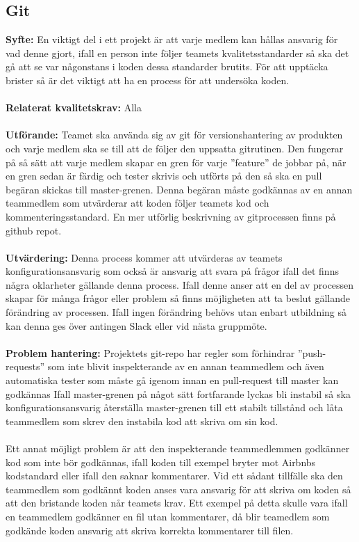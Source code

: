 \documentclass[10pt]{article}
\begin{document}
	\subsection{Git}
	\textbf{Syfte:} En viktigt del i ett projekt är att varje medlem kan hållas ansvarig för vad denne gjort, ifall en person inte följer teamets kvalitetsstandarder så ska det gå att se var någonstans i koden dessa standarder brutits. För att upptäcka brister så är det viktigt att ha en process för att undersöka koden.
	\\\\
	\textbf{Relaterat kvalitetskrav:} Alla
	\\\\
	\textbf{Utförande:} Teamet ska använda sig av git för versionshantering av produkten och varje medlem ska se till att de följer den uppsatta gitrutinen. Den fungerar på så sätt att varje medlem skapar en gren för varje ''feature'' de jobbar på, när en gren sedan är färdig och tester skrivis och utförts på den så ska en pull begäran skickas till master-grenen. Denna begäran måste godkännas av en annan teammedlem som utvärderar att koden följer teamets kod och kommenteringsstandard. En mer utförlig beskrivning av gitprocessen finns på github repot\cite{bib-gitguide}.
	\\\\
	\textbf{Utvärdering:} Denna process kommer att utvärderas av teamets konfigurationsansvarig som också är ansvarig att svara på frågor ifall det finns några oklarheter gällande denna process. Ifall denne anser att en del av processen skapar för många frågor eller problem så finns möjligheten att ta beslut gällande förändring av processen. Ifall ingen förändring behövs utan enbart utbildning så kan denna ges över antingen Slack eller vid nästa gruppmöte.
	\\\\
	\textbf{Problem hantering:} Projektets git-repo har regler som förhindrar ''push-requests'' som inte blivit inspekterande av en annan teammedlem och även automatiska tester som måste gå igenom innan en pull-request till master kan godkännas Ifall master-grenen på något sätt fortfarande lyckas bli instabil så ska konfigurationsansvarig återställa master-grenen till ett stabilt tillstånd och låta teammedlem som skrev den instabila kod att skriva om sin kod.\\\\
	Ett annat möjligt problem är att den inspekterande teammedlemmen godkänner kod som inte bör godkännas, ifall koden till exempel bryter mot Airbnbs kodstandard eller ifall den saknar kommentarer. Vid ett sådant tillfälle ska den teammedlem som godkännt koden anses vara ansvarig för att skriva om koden så att den bristande koden når teamets krav. Ett exempel på detta skulle vara ifall en teammedlem godkänner en fil utan kommentarer, då blir teamedlem som godkände koden ansvarig att skriva korrekta kommentarer till filen.
\end{document}
